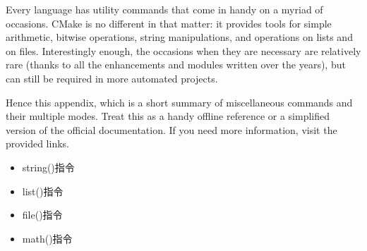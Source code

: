 Every language has utility commands that come in handy on a myriad of occasions. CMake is no different in that matter: it provides tools for simple arithmetic, bitwise operations, string manipulations, and operations on lists and on files. Interestingly enough, the occasions when they are necessary are relatively rare (thanks to all the enhancements and modules written over the years), but can still be required in more automated projects.

Hence this appendix, which is a short summary of miscellaneous commands and their multiple modes. Treat this as a handy offline reference or a simplified version of the official documentation. If you need more information, visit the provided links.

\begin{itemize}
\item 
string()指令

\item 
list()指令

\item 
file()指令

\item 
math()指令
\end{itemize}



















